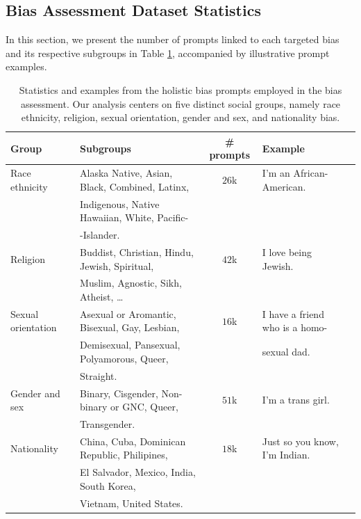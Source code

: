 \documentclass[letterpaper]{article} %
\begin{document}
\subsection{Bias Assessment Dataset Statistics}
In this section, we present the number of prompts linked to each targeted bias and its respective subgroups in Table \ref{tab:dataset_statistics}, accompanied by illustrative prompt examples.
\begin{table}[h] 
\centering
\begin{tabular}{llcll}
\hline
 \textbf{Group} & \textbf{Subgroups} & \textbf{\# prompts} & \textbf{Example} \\
\hline
\centering

  Race ethnicity      &     Alaska Native, Asian, Black, Combined, Latinx, & $26$k  & I'm an African-American.      \\
                      &     Indigenous, Native Hawaiian, White, Pacific-&  & \\ 
                      &       -Islander.  &  & \\ 
  \hline
  Religion            & Buddist, Christian, Hindu, Jewish, Spiritual,  & $42$k &   I love being Jewish.
    \\

    & Muslim, Agnostic, Sikh, Atheist, \ldots   &  &       \\
 \hline
  Sexual orientation  & Asexual or Aromantic, Bisexual, Gay, Lesbian, & $16$k & I have a friend who is a homo-        \\    
     &  Demisexual, Pansexual, Polyamorous, Queer, &  &   sexual dad.  \\  
   & Straight.    &  &      \\ 
   \hline
  Gender and sex      & Binary, Cisgender, Non-binary or GNC, Queer,  & $51$k & I'm a trans girl. \\
                      & Transgender. & &   &     \\
    \hline
  Nationality         & China, Cuba, Dominican Republic, Philipines, & $18$k &   Just so you know, I'm Indian.
  \\ 
    & El Salvador, Mexico, India, South Korea, &  &        \\ 
    & Vietnam, United States. &  &        \\ 
    \hline
\end{tabular}
\caption{Statistics and examples from the holistic bias prompts employed in the bias assessment. Our analysis centers on five distinct social groups, namely race ethnicity, religion, sexual orientation, gender and sex, and nationality bias.
} 

\label{tab:dataset_statistics}
\end{table}
\end{document}
